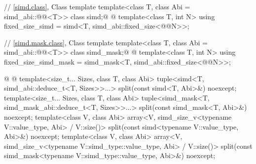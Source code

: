 \begin{codeblock}
{  // \ref{simd.class}, Class template 
  template<class T, class Abi = simd_abi::@@<T>> class simd;@
  @
  template<class T, int N> using fixed_size_simd = simd<T, simd_abi::fixed_size<@@N>>;

  // \ref{simd.mask.class}, Class template 
  template<class T, class Abi = simd_abi::@@<T>> class simd_mask;@
  @
  template<class T, int N> using fixed_size_simd_mask = simd_mask<T, simd_abi::fixed_size<@@N>>;

  @%
@
  template<size_t... Sizes, class T, class Abi>
    tuple<simd<T, simd_abi::deduce_t<T, Sizes>>...>
      split(const simd<T, Abi>&) noexcept;
  template<size_t... Sizes, class T, class Abi>
    tuple<simd_mask<T, simd_mask_abi::deduce_t<T, Sizes>>...>
      split(const simd_mask<T, Abi>&) noexcept;
  template<class V, class Abi>
    array<V, simd_size_v<typename V::value_type, Abi> / V::size()>
      split(const simd<typename V::value_type, Abi>&) noexcept;
  template<class V, class Abi>
    array<V, simd_size_v<typename V::simd_type::value_type, Abi> / V::size()>
      split(const simd_mask<typename V::simd_type::value_type, Abi>&) noexcept;

}
\end{codeblock}
